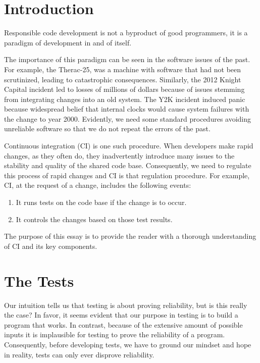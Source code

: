\documentclass{article}
\begin{document}
\pagestyle{fancy}
\fancyhf{}
\cfoot{\thepage}

\tableofcontents
\newpage
\section{Introduction}
Responsible code development is not a byproduct of good programmers, it is a paradigm of development in and of itself. 

The importance of this paradigm can be seen in the software issues of the past.
For example, the Therac-25, was a machine with software that had not been scrutinized, leading to catastrophic consequences. 
Similarly, the 2012 Knight Capital incident led to losses of millions of dollars because of issues stemming from integrating changes into an old system. 
The Y2K incident induced panic because widespread belief that internal clocks would cause system failures with the change to year 2000. 
Evidently, we need some standard procedures avoiding unreliable software so that we do not repeat the errors of the past.

Continuous integration (CI) is one such procedure. 
When developers make rapid changes, as they often do, they inadvertently introduce many issues to the stability and quality of the shared code base.
Consequently, we need to regulate this process of rapid changes and CI is that regulation procedure.
For example, CI, at the request of a change, includes the following events:
\begin{enumerate}
    \item It runs tests on the code base if the change is to occur.
    \item It controls the changes based on those test results.
\end{enumerate}

The purpose of this essay is to provide the reader with a thorough understanding of CI and its key components.

\section{The Tests}

Our intuition tells us that testing is about proving reliability, but is this really the case?
In favor, it seems evident that our purpose in testing is to build a program that works.
In contrast, because of the extensive amount of possible inputs it is implausible for testing to prove the reliability of a program. \cite{meyer_seven_2008}
Consequently, before developing tests, we have to ground our mindset and hope in reality, tests can only ever disprove reliability.
\end{document}
